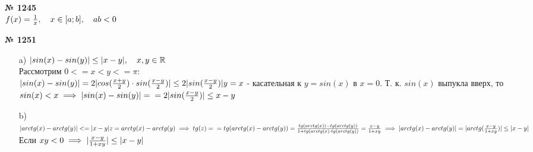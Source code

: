 \documentclass[12pt]{article}
\DeclarePairedDelimiter\abs{\lvert}{\rvert}%
\newenvironment{task}[1][0]{\vspace{.5cm} {\textbf{№ #1} \vspace{.5cm}\\ }\large}{}
\begin{document}
{\begin{task}[1245]
$f(x)=\frac{1}{x}, \quad x\in [a; b], \quad ab<0\\$
\end{task}

\begin{task}[1251]
\begin{itemize}
	\item[a)]{$\abs{sin(x)-sin(y)} \leq \abs{x-y}, \quad x, y \in \mathbb{R}$\\
Рассмотрим $0<=x<y<=\pi:$\\
$\abs{sin(x)-sin(y)}=2\abs{cos(\frac{x+y}{2}) \cdot sin(\frac{x-y}{2})} \leq 2 \abs{sin(\frac{x-y}{2})}\\
y=x$ - касательная к $y=sin(x)$ в $x=0$. Т. к. $sin(x)$ выпукла вверх, то $sin(x)<x \implies \abs{sin(x)-sin(y)}=\\=2\abs{sin(\frac{x-y}{2})} \leq x-y$
}
\item[b)]{$\newline
\abs{arctg(x)-arctg(y)}<= \abs{x-y}\\
z=arctg(x)-arctg(y) \implies tg(z)=\\=tg(arctg(x)-arctg(y))=\frac{tg(arctg(x))-tg(arctg(y))}{1+tg(arctg(x)\cdot tg(arctg(y))}=\frac{x-y}{1+xy} \implies
\abs{arctg(x)-arctg(y)} = \abs{arctg(\frac{x-y}{1+xy})} \leq \abs{x-y}$\\
Если $xy<0 \implies \abs{\frac{x-y}{1+xy}} \leq \abs{x-y}$
}
\end{itemize}
\end{task}
\end{document}
